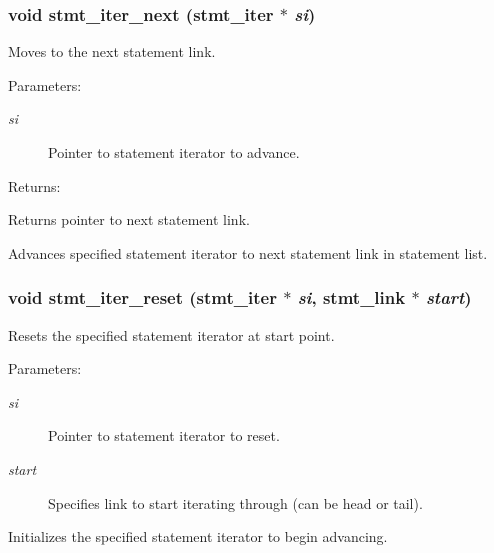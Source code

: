 \subsubsection{\setlength{\rightskip}{0pt plus 5cm}void stmt\_\-iter\_\-next ({\bf stmt\_\-iter} $\ast$ {\em si})}\label{iter_8c_a1}


Moves to the next statement link.

\begin{Desc}
\item[Parameters: ]\par
\begin{description}
\item[{\em 
si}]Pointer to statement iterator to advance.\end{description}
\end{Desc}
\begin{Desc}
\item[Returns: ]\par
Returns pointer to next statement link.\end{Desc}
Advances specified statement iterator to next statement link in statement list. 
\subsubsection{\setlength{\rightskip}{0pt plus 5cm}void stmt\_\-iter\_\-reset ({\bf stmt\_\-iter} $\ast$ {\em si}, {\bf stmt\_\-link} $\ast$ {\em start})}\label{iter_8c_a0}


Resets the specified statement iterator at start point.

\begin{Desc}
\item[Parameters: ]\par
\begin{description}
\item[{\em 
si}]Pointer to statement iterator to reset. \item[{\em 
start}]Specifies link to start iterating through (can be head or tail).\end{description}
\end{Desc}
Initializes the specified statement iterator to begin advancing. 